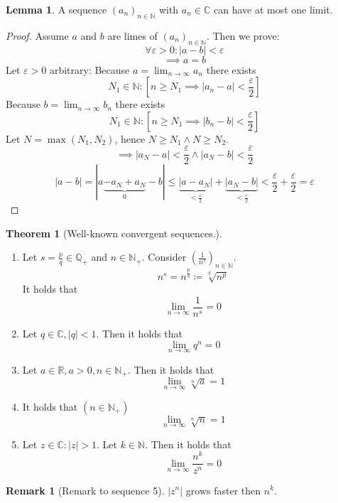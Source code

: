 \documentclass[a4paper,landscape,twocolumn]{article}
\theoremstyle{definition}
\newtheorem{theorem}{Theorem}
\newtheorem{rem}{Remark}
\newtheorem{lemma}{Lemma}
\newcommand\abs[1]{\left|#1\right|}
\begin{document}
\begin{lemma}
  A sequence $(a_n)_{n \in \mathbb N}$ with $a_n \in \mathbb C$ can have at most one limit.
\end{lemma}
\begin{proof}
  Assume $a$ and $b$ are limes of $(a_n)_{n \in \mathbb N}$. Then we prove:
  \[ \forall \varepsilon > 0: \abs{a - b} < \varepsilon \]
  \[ \implies a = b \]
  Let $\varepsilon > 0$ arbitrary:
  Because $a = \lim_{n \to \infty} a_n$ there exists
  \[ N_1 \in \mathbb N: \left[n \geq N_1 \implies \abs{a_n - a} < \frac{\varepsilon}2\right] \]
  Because $b = \lim_{n \to \infty} b_n$ there exists
  \[ N_1 \in \mathbb N: \left[n \geq N_1 \implies \abs{b_n - b} < \frac{\varepsilon}2\right] \]
  Let $N = \max(N_1, N_2)$, hence $N \geq N_1 \land N \geq N_2$.
  \[ \implies \abs{a_N - a} < \frac{\varepsilon}{2} \land \abs{a_N - b} < \frac{\varepsilon}{2} \]
  \[ \abs{a - b} = |a \underbrace{- a_N + a_N}_0 - b| \leq \underbrace{\abs{a - a_N}}_{< \frac{\varepsilon}2} + \underbrace{\abs{a_N - b}}_{< \frac{\varepsilon}2} < \frac{\varepsilon}{2} + \frac{\varepsilon}{2} = \varepsilon \]
\end{proof}

\begin{theorem}[Well-known convergent sequences.] \hfill{}
  \begin{enumerate}
    \item
      Let $s = \frac pq \in \mathbb Q_+$ and $n \in \mathbb N_+$. Consider $\left(\frac 1{n^s}\right)_{n \in \mathbb N}$.
      \[ n^s = n^{\frac pq} \coloneqq \sqrt[q]{n^p} \]
      It holds that
      \[ \lim_{n \to \infty} \frac{1}{n^s} = 0 \]
    \item Let $q \in \mathbb C, \abs{q} < 1$. Then it holds that
      \[ \lim_{n \to \infty} q^n = 0 \]
    \item Let $a \in \mathbb R, a > 0, n \in \mathbb N_+$. Then it holds that
      \[ \lim_{n \to \infty} \sqrt[n]{a} = 1 \]
    \item It holds that $(n \in \mathbb N_+)$
      \[ \lim_{n \to \infty} \sqrt[n]{n} = 1 \]
    \item Let $z \in \mathbb C: \abs{z} > 1$. Let $k \in \mathbb N$.
      Then it holds that \[ \lim_{n \to \infty} \frac{n^k}{z^n} = 0 \]
  \end{enumerate}
\end{theorem}

\begin{rem}[Remark to sequence 5]
  $\abs{z^n}$ grows faster then $n^k$.
\end{rem}
\end{document}

